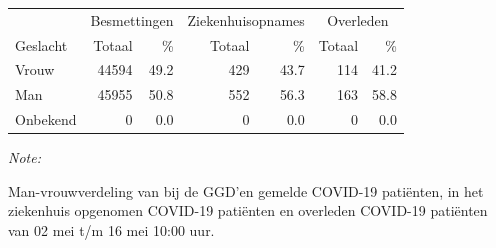 \documentclass[
  english,
  man,floatsintext]{apa6}
\begin{document}
\begin{table}
\centering\begingroup\fontsize{11}{13}\selectfont

\begin{threeparttable}
\begin{tabular}{lrrrrrr}
\toprule
\multicolumn{1}{c}{ } & \multicolumn{2}{c}{Besmettingen} & \multicolumn{2}{c}{Ziekenhuisopnames} & \multicolumn{2}{c}{Overleden} \\
\cmidrule(l{3pt}r{3pt}){2-3} \cmidrule(l{3pt}r{3pt}){4-5} \cmidrule(l{3pt}r{3pt}){6-7}
Geslacht & Totaal & \% & Totaal & \% & Totaal & \%\\
\midrule
Vrouw & 44594 & 49.2 & 429 & 43.7 & 114 & 41.2\\
Man & 45955 & 50.8 & 552 & 56.3 & 163 & 58.8\\
Onbekend & 0 & 0.0 & 0 & 0.0 & 0 & 0.0\\
\bottomrule
\end{tabular}
\begin{tablenotes}
\item \textit{Note: } 
\item Man-vrouwverdeling van bij de GGD’en gemelde COVID-19 patiënten, in het ziekenhuis opgenomen COVID-19 patiënten en overleden COVID-19 patiënten van 02 mei t/m 16 mei 10:00 uur.
\end{tablenotes}
\end{threeparttable}
\endgroup{}
\end{table}
\newpage
\end{document}
